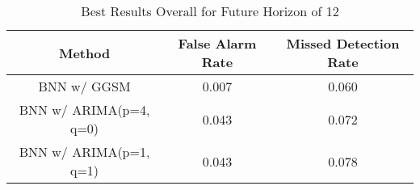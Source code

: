 \begin{table*}[th!]
\centering
\caption{Best Results Overall for Future Horizon of 12}
    \label{table:ourresults}
    \begin{tabular}{|c|c|c|}
        \hline
        Method & False Alarm Rate & Missed Detection Rate \\
        \hline
        \hline
        BNN w/ GGSM & 0.007 & 0.060 \\
        \hline
        BNN w/ ARIMA(p=4, q=0) & 0.043 & 0.072 \\
        \hline
        BNN w/ ARIMA(p=1, q=1) &  0.043 & 0.078 \\
        \hline
    \end{tabular}
\end{table*}

